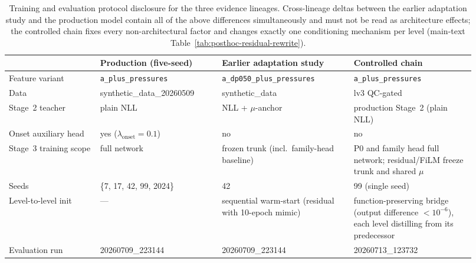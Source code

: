 \begin{table}[!ht]
\centering
\footnotesize
\setlength{\tabcolsep}{4pt}
\begin{tabular}{@{}L{0.18\linewidth}L{0.24\linewidth}L{0.26\linewidth}L{0.24\linewidth}@{}}
\toprule
 & Production (five-seed) & Earlier adaptation study & Controlled chain \\
\midrule
Feature variant & \texttt{a\_plus\_pressures} & \texttt{a\_dp050\_plus\_pressures} & \texttt{a\_plus\_pressures} \\
Data & synthetic\_data\_20260509 & synthetic\_data & lv3 QC-gated \\
Stage~2 teacher & plain NLL & NLL + \(\mu\)-anchor & production Stage~2 (plain NLL) \\
Onset auxiliary head & yes (\(\lambda_{\mathrm{onset}}=0.1\)) & no & no \\
Stage~3 training scope & full network & frozen trunk (incl.\ family-head baseline) & P0 and family head full network; residual/FiLM freeze trunk and shared \(\mu\) \\
Seeds & \{7, 17, 42, 99, 2024\} & 42 & 99 (single seed) \\
Level-to-level init & --- & sequential warm-start (residual with 10-epoch mimic) & function-preserving bridge (output difference \(<10^{-6}\)), each level distilling from its predecessor \\
Evaluation run & 20260709\_223144 & 20260709\_223144 & 20260713\_123732 \\
\bottomrule
\end{tabular}
\caption{Training and evaluation protocol disclosure for the three evidence lineages. Cross-lineage deltas between the earlier adaptation study and the production model contain all of the above differences simultaneously and must not be read as architecture effects; the controlled chain fixes every non-architectural factor and changes exactly one conditioning mechanism per level (main-text Table~\ref{tab:posthoc-residual-rewrite}).}
\label{tab:residual-lineage-disclosure}
\end{table}

